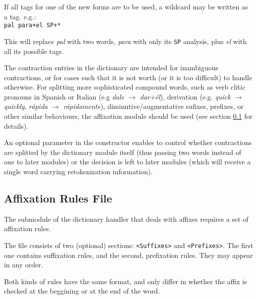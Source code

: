 \documentclass[a4paper]{book}
\begin{document}
   If all tags for one of the new forms are to be used, a wildcard may
   be written as a tag. e.g.:\\
  \verb#pal para+el SP+*#

   This will replace {\sl pal} with two words, {\sl para} with only its
   {\tt SP} analysis, plus {\sl el} with all its possible tags.  

  The contraction entries in the dictionary are intended for
  inambiguous contractions, or for cases such that it is not worth (or
  it is too difficult) to handle otherwise.  For splitting more
  sophisticated compound words, such as verb clitic pronouns in
  Spanish or Italian (e.g {\sl dale $\rightarrow$ dar+\'el}), derivation (e.g. {\sl
    quick $\rightarrow$ quickly}, {\sl r\'apida $\rightarrow$ r\'apidamente}),
  diminutive/augmentative sufixes, prefixes, or other similar
  behaviours, the affixation module should be used (see section
  \ref{file-suf} for details).

  An optional parameter in the constructor enables to control whether
  contractions are splitted by the dictionary module itself (thus
  passing two words instead of one to later modules) or the decision
  is left to later modules (which will receive a single word carrying
  retokenization information).

\subsection{Affixation Rules File}
\label{file-suf}

 The submodule of the dictionary handler that deals with affixes
 requires a set of affixation rules.

 The file consists of two (optional) sections: \verb#<Suffixes># and
 \verb#<Prefixes>#. The first one contains suffixation rules, and the
 second, prefixation rules. They may appear in any order.

 Both kinds of rules have the same format, and only differ in whether
 the affix is checked at the beggining or at the end of the word.
\end{document}
